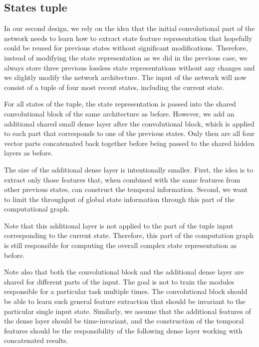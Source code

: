 \newpage

\subsection{States tuple}
In our second design, we rely on the idea that the initial convolutional part of the network needs to learn how to extract state feature representation that hopefully could be reused for previous states without significant modifications.
Therefore, instead of modifying the state representation as we did in the previous case, we always store three previous lossless state representations without any changes and we slightly modify the network architecture.
The input of the network will now consist of a tuple of four most recent states, including the current state.

For all states of the tuple, the state representation is passed into the shared convolutional block of the same architecture as before.
However, we add an additional shared small dense layer after the convolutional block, which is applied to each part that corresponds to one of the previous states.
Only then are all four vector parts concatenated back together before being passed to the shared hidden layers as before.

The size of the additional dense layer is intentionally smaller.
First, the idea is to extract only those features that, when combined with the same features from other previous states, can construct the temporal information.
Second, we want to limit the throughput of global state information through this part of the computational graph.

Note that this additional layer is not applied to the part of the tuple input corresponding to the current state.
Therefore, this part of the computation graph is still responsible for computing the overall complex state representation as before.

Note also that both the convolutional block and the additional dense layer are shared for different parts of the input.
The goal is not to train the modules responsible for a particular task multiple times.
The convolutional block should be able to learn such general feature extraction that should be invariant to the particular single input state.
Similarly, we assume that the additional features of the dense layer should be time-invariant, and the construction of the temporal features should be the responsibility of the following dense layer working with concatenated results.

